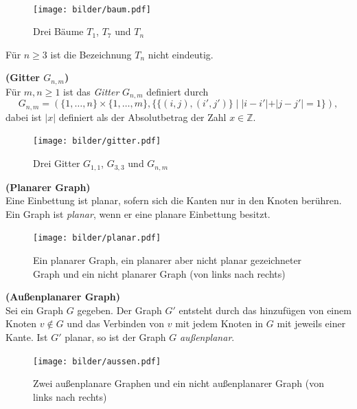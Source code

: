 ~\linebreak
\vspace{-13mm}
\begin{figure}[h!]
		\centering 		 
   \texttt{[image: bilder/baum.pdf]}
	\caption{Drei Bäume $T_{1}$, $T_{7}$ und $T_{n}$}
  	 \end{figure}
  	 \vspace{-4mm}
\begin{bem}
Für $n \geq 3$ ist die Bezeichnung $T_n$ nicht eindeutig.  
\end{bem}
\newpage
\begin{defi}{\textbf{(Gitter $G_{n,m}$)}}\\
Für $m,n \geq 1$ ist das \emph{Gitter} $G_{n,m}$ definiert durch $$G_{n,m}=(\{1,\ldots,n\}\times\{1,\ldots ,m\},\{\{(i,j),(i',j')\}\;|\;|i-i'|+|j-j'|=1\} ),$$ dabei ist $|x|$ definiert als der Absolutbetrag der Zahl $x \in \mathbb{Z}$.\cite{buchwanke} 
\end{defi}
\vspace{-4mm}
\begin{figure}[h!]
		\centering 		 
   \texttt{[image: bilder/gitter.pdf]}
	\caption{Drei Gitter $G_{1,1}$, $G_{3,3}$ und $G_{n,m}$}
  	 \end{figure}

\begin{defi}{\textbf{(Planarer Graph)}}\\
Eine Einbettung ist planar, sofern sich die Kanten nur in den Knoten berühren.\newline
Ein Graph ist \emph{planar}, wenn er eine planare Einbettung besitzt.
\end{defi}

\begin{figure}[h!]
		\centering 		 
   \texttt{[image: bilder/planar.pdf]}
	\caption{Ein planarer Graph, ein planarer aber nicht planar gezeichneter Graph und ein nicht planarer Graph (von links nach rechts)}
  	 \end{figure}


\begin{defi}{\textbf{(Außenplanarer Graph)}}\\
Sei ein Graph $G$ gegeben. Der Graph $G'$ entsteht durch das hinzufügen von einem Knoten $v \notin G$ und das Verbinden von $v$ mit jedem Knoten in $G$ mit jeweils einer Kante. Ist $G'$ planar, so ist der Graph $G$ \emph{außenplanar}. 
\end{defi}
\begin{figure}[h!]
		\centering 		 
   \texttt{[image: bilder/aussen.pdf]}
	\caption{Zwei außenplanare Graphen und ein nicht außenplanarer Graph (von links nach rechts)}
  	 \end{figure}

